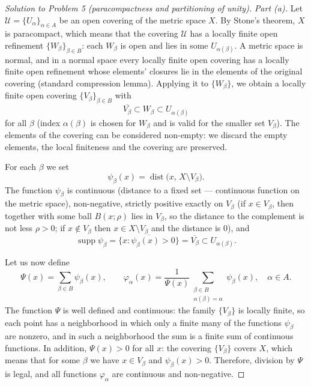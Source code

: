 \documentclass[a4paper,12pt]{report}
\begin{document}
\begin{proof}[Solution to Problem \textup{5} \textup{(}paracompactness and partitioning of unity\textup{)}]
\textit{Part \textup{(a)}.} Let $\mathcal U=\{U_\alpha\}_{\alpha\in A}$ be an open covering of the metric space $X$. By Stone's theorem, $X$ is paracompact, which means that the covering $\mathcal U$ has a locally finite open refinement $\{W_\beta\}_{\beta\in B}$: each $W_\beta$ is open and lies in some $U_{\alpha(\beta)}$. A metric space is normal, and in a normal space every locally finite open covering has a locally finite open refinement whose elements' closures lie in the elements of the original covering \textup{(}standard compression lemma\textup{)}. Applying it to $\{W_\beta\}$, we obtain a locally finite open covering $\{V_\beta\}_{\beta\in B}$ with
\[
\overline{V_\beta}\subset W_\beta\subset U_{\alpha(\beta)}
\]
for all $\beta$ \textup{(}index $\alpha(\beta)$ is chosen for $W_\beta$ and is valid for the smaller set $V_\beta$\textup{)}. The elements of the covering can be considered non-empty: we discard the empty elements, the local finiteness and the covering are preserved.

For each $\beta$ we set
\[
\psi_\beta(x)=\operatorname{dist}\bigl(x,\,X\setminus V_\beta\bigr).
\]
The function $\psi_\beta$ is continuous \textup{(}distance to a fixed set --- continuous function on the metric space\textup{)}, non-negative, strictly positive exactly on $V_\beta$ \textup{(}if $x\in V_\beta$, then together with some ball $B(x;\rho)$ lies in $V_\beta$, so the distance to the complement is not less $\rho>0$; if $x\notin V_\beta$ then $x\in X\setminus V_\beta$ and the distance is $0$\textup{)}, and
\[
\operatorname{supp}\psi_\beta=\overline{\{x\colon\psi_\beta(x)>0\}}=\overline{V_\beta}\subset U_{\alpha(\beta)} .
\]

Let us now define
\[
\Psi(x)=\sum_{\beta\in B}\psi_\beta(x),\qquad \varphi_\alpha(x)=\frac{1}{\Psi(x)}\sum_{\substack{\beta\in B\\ \alpha(\beta)=\alpha}}\psi_\beta(x),\quad \alpha\in A .
\]
The function $\Psi$ is well defined and continuous: the family $\{V_\beta\}$ is locally finite, so each point has a neighborhood in which only a finite many of the functions $\psi_\beta$ are nonzero, and in such a neighborhood the sum is a finite sum of continuous functions. In addition, $\Psi(x)>0$ for all $x$: the covering $\{V_\beta\}$ covers $X$, which means that for some $\beta$ we have $x\in V_\beta$ and $\psi_\beta(x)>0$. Therefore, division by $\Psi$ is legal, and all functions $\varphi_\alpha$ are continuous and non-negative.


\end{proof}
\end{document}

